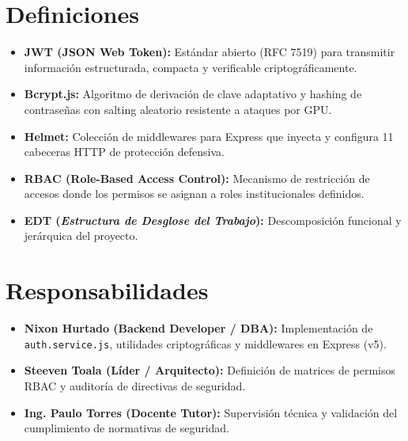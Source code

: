 \documentclass[12pt,a4paper]{article}
\begin{document}
\section{Definiciones}
\begin{itemize}[leftmargin=1.5em, itemsep=2pt, topsep=2pt]
    \item \textbf{JWT (JSON Web Token):} Estándar abierto (RFC 7519) para transmitir información estructurada, compacta y verificable criptográficamente.
    \item \textbf{Bcrypt.js:} Algoritmo de derivación de clave adaptativo y hashing de contraseñas con salting aleatorio resistente a ataques por GPU.
    \item \textbf{Helmet:} Colección de middlewares para Express que inyecta y configura 11 cabeceras HTTP de protección defensiva.
    \item \textbf{RBAC (Role-Based Access Control):} Mecanismo de restricción de accesos donde los permisos se asignan a roles institucionales definidos.
    \item \textbf{EDT (\textit{Estructura de Desglose del Trabajo}):} Descomposición funcional y jerárquica del proyecto.
\end{itemize}

\section{Responsabilidades}
\begin{itemize}[leftmargin=1.5em, itemsep=2pt, topsep=2pt]
    \item \textbf{Nixon Hurtado (Backend Developer / DBA):} Implementación de \texttt{auth.service.js}, utilidades criptográficas y middlewares en Express (v5).
    \item \textbf{Steeven Toala (Líder / Arquitecto):} Definición de matrices de permisos RBAC y auditoría de directivas de seguridad.
    \item \textbf{Ing. Paulo Torres (Docente Tutor):} Supervisión técnica y validación del cumplimiento de normativas de seguridad.
\end{itemize}

\end{document}
